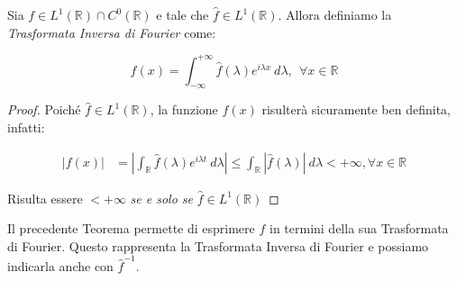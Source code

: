 \begin{theorem}
    Sia $f \in L^1(\mathbb{R}) \cap C^0(\mathbb{R})$ e tale che $\hat{f} \in
        L^1(\mathbb{R})$. Allora definiamo la \textit{Trasformata Inversa di
        Fourier} come:
    
    $$
        f(x) = \int_{-\infty}^{+\infty} \hat{f}(\lambda) e^{i \lambda x} \
        d\lambda, \ \ \forall x \in \mathbb{R}
    $$
\end{theorem}

\begin{proof}
    Poiché $\hat{f} \in L^1(\mathbb{R})$, la funzione $f(x)$ risulterà
    sicuramente ben definita, infatti:
    
    \begin{equation}
        \begin{aligned}
            |f(x)| & = \left|\int_{\mathbb{R}} \hat{f}(\lambda) e^{i \lambda t} \ d\lambda \right| \leq \int_{\mathbb{R}} |\hat{f}(\lambda)| \ d\lambda < + \infty, \forall x \in \mathbb{R}
        \end{aligned}
    \end{equation}
    
    Risulta essere $< +\infty$ \textit{se e solo se} $\hat{f}\in L^1(\mathbb{R})$
    
\end{proof}

Il precedente Teorema permette di esprimere $f$ in termini della sua Trasformata
di Fourier. Questo rappresenta la Trasformata Inversa di Fourier e possiamo
indicarla anche con $\hat{f}^{-1}$.


